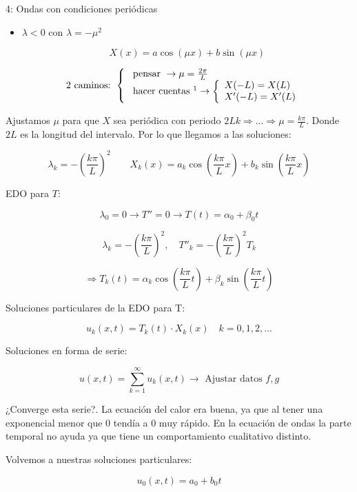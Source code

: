 \begin{example}{4: Ondas con condiciones periódicas}
\begin{itemize}
				\item $\lambda < 0$ con $\lambda = -\mu^2$

					\[ X (x) = a \cos (\mu x) + b \sin (\mu x) \]

					\[\text{2 caminos: }\left\{\begin{array}{l}
						\text{ pensar }\rightarrow \mu = \frac{2\pi}{L} \\
						\text{ hacer cuentas }\footnotemark\rightarrow \left\{ \begin{array}{l}
							X(-L) = X(L) \\
							X'(-L) = X'(L)
						\end{array} \right.
					\end{array}
					\right. \]
			\end{itemize}

			Ajustamos $\mu$ para que $X$ sea periódica con periodo $2L k \Rightarrow … \Rightarrow \mu = \frac{k \pi}{L}$. Donde $2L$ es la longitud del intervalo. Por lo que llegamos a las soluciones:

			\[
			\lambda_k = -\left(\frac{k\pi}{L}\right)^2\quad\quad X_k(x) = a_k \cos \left( \frac{k\pi}{L} x \right) + b_k \sin \left( \frac{k\pi}{L} x \right)
			\]

			EDO para $T$:

			\[ \lambda_0 = 0 \rightarrow T''=0 \rightarrow T(t) = \alpha_0 + \beta_0 t\]

			\[ \lambda_k = - \left( \frac{k\pi}{L} \right)^2, \quad T''_k = - \left( \frac{k\pi}{L} \right)^2 T_k \]

			\[\Rightarrow T_k(t) = \alpha_k \cos \left( \frac{k\pi}{L} t \right) + \beta_k \sin \left( \frac{k\pi}{L} t \right) \]

			Soluciones particulares de la EDO para T:

			\[u_k (x,t) = T_k(t) \cdot X_k(x) \quad k = 0,1,2,… \]


			Soluciones en forma de serie:

			\[u(x,t) = \sum_{k=1}^{\infty} u_k (x,t) \rightarrow \text{ Ajustar datos } f,g \]

			¿Converge esta serie?. La ecuación del calor era buena, ya que al tener una exponencial menor que 0 tendía a 0 muy rápido. En la ecuación de ondas la parte temporal no ayuda ya que tiene un comportamiento cualitativo distinto.

			Volvemos a nuestras soluciones particulares:

			\[u_0(x,t) = a_0 + b_0t\]


\end{example}

